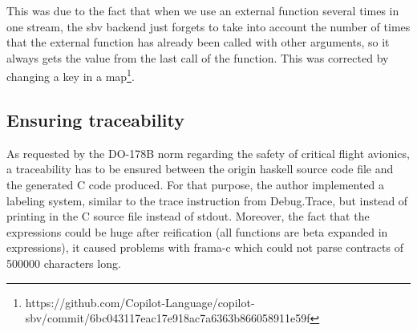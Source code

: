 \documentclass[a4paper,11pt,final]{article}
\begin{document}
	This was due to the fact that when we use an external function several times in one stream, the sbv backend just forgets to take into account the number of times that the external function has already been called with other arguments, so it always gets the value from the last call of the function. This was corrected by changing a key in a map\footnote{https://github.com/Copilot-Language/copilot-sbv/commit/6bc043117eac17e918ac7a6363b866058911e59f}. 
	
	\subsection{Ensuring traceability}
	
	As requested by the DO-178B norm regarding the safety of critical flight avionics, a traceability has to be ensured between the origin haskell source code file and the generated C code produced. For that purpose, the author implemented a labeling system, similar to the trace instruction from Debug.Trace, but instead of printing in the C source file instead of stdout. Moreover, the fact that the expressions could be huge after reification (all functions are beta expanded in expressions), it caused problems with frama-c which could not parse contracts of 500000 characters long. 
	
\end{document}
